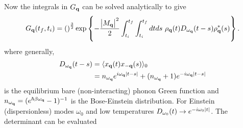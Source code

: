 Now the integrals in $G_{\vb{q}}$ can be solved analytically to give
\begin{equation}
    G_{\vb{q}}(t_f, t_i) = \left(\right)^{\frac{3}{2}} \exp \left\{ -\frac{\abs{M_{\vb{q}}}^2}{2} \int_{t_i}^{t_f} \int_{t_i}^{t_f} dt ds\ \rho_{\vb{q}}(t) D_{\omega_{\vb{q}}}(t-s) \rho^*_{\vb{q}}(s) \right\}.
\label{eqn-2211-7}
\end{equation}
where generally,
\begin{equation}
\begin{aligned}
    D_{\omega_{\vb{q}}}(t-s) &= \langle x_{\vb{q}}(t) x_{-\vb{q}}(s) \rangle_{0} \\
    & = n_{\omega_{\vb{q}}} e^{i \omega_{\vb{q}} \abs{t-s}} + (n_{\omega_{\vb{q}}} + 1) e^{-i \omega_{\vb{q}}\abs{t-s}}
\end{aligned}
\end{equation}
is the equilibrium bare (non-interacting) phonon Green function and $n_{\omega_{\vb{q}}} = (e^{\hbar\beta\omega_{\vb{q}}} - 1)^{-1}$ is the Bose-Einstein distribution. For Einstein (dispersionless) modes $\omega_0$ and low temperatures $D_{\omega_0}(t) \to e^{-i \omega_0 \abs{t}}$. The determinant can be evaluated

